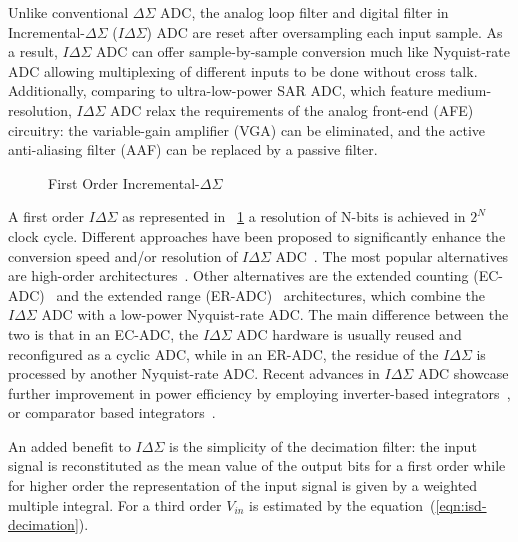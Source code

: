 Unlike conventional \(\Delta\Sigma \) ADC, the analog loop filter and digital filter in Incremental-\(\Delta\Sigma \) (\(I\Delta\Sigma \)) ADC are reset after oversampling each input sample. As a result, \(I\Delta\Sigma \) ADC can offer sample-by-sample conversion much like Nyquist-rate ADC allowing multiplexing of different inputs to be done without cross talk. Additionally, comparing to ultra-low-power SAR ADC, which feature medium-resolution, \(I\Delta\Sigma \) ADC relax the requirements of the analog front-end (AFE) circuitry: the variable-gain amplifier (VGA) can be eliminated, and the active anti-aliasing filter (AAF) can be replaced by a passive filter.

\begin{figure}[htp]
	\centering
	\resizebox{\textwidth}{!} {}
	\caption{First Order Incremental-\(\Delta\Sigma \)}
	\label{fig:isd_first_order_principle}
\end{figure}

A first order \(I\Delta\Sigma \) as represented in \figurename~\ref{fig:isd_first_order_principle} a resolution of N-bits is achieved in \(2^N \) clock cycle. Different approaches have been proposed to significantly enhance the conversion speed and/or resolution of \(I\Delta\Sigma \) ADC~\cite{Markus2004,Quiquempoix2006,Caldwell2010}. The most popular alternatives are high-order architectures~\cite{Au1997,Babanezhad1991,Baird1996}. Other alternatives are the extended counting (EC-ADC)~\cite{Jeon2017,Baird1995,Chen2016} and the extended range (ER-ADC)~\cite{Agah2010,Rossi2009} architectures, which combine the \(I\Delta\Sigma \) ADC with a low-power Nyquist-rate ADC\@. The main difference between the two is that in an EC-ADC, the \(I\Delta\Sigma \) ADC hardware is usually reused and reconfigured as a cyclic ADC, while in an ER-ADC, the residue  of the \(I\Delta\Sigma \) is processed by another Nyquist-rate ADC\@. Recent advances in \(I\Delta\Sigma \) ADC showcase further improvement in power efficiency by employing inverter-based integrators~\cite{Chae2009}, or comparator based integrators~\cite{Yamamoto2012}.

An added benefit to \(I\Delta\Sigma \) is the simplicity of the decimation filter: the input signal is reconstituted as the mean value of the output bits for a first order while for higher order the representation of the input signal is given by a weighted multiple integral. For a third order \(V_{in}\) is estimated by the equation~(\ref{eqn:isd-decimation}).

